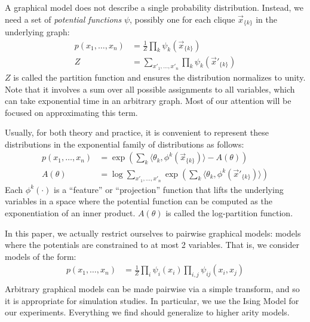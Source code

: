 \documentclass[times, 10pt,twocolumn]{article}
\newcommand{\clique}[1]{\vec #1_{\{k\}}}
\begin{document}
A graphical model does not describe a single probability distribution.
Instead, we need a set of \textit{potential functions} $\psi$, possibly
one for each clique $\clique{x}$ in the underlying graph:
\begin{equation}
  \begin{split}
    p(x_1, \ldots, x_n) &= \frac1Z \prod_{k} \psi_k(\clique{x}) \\
    Z &= \sum_{x'_1, \ldots, x'_n} \prod_{k} \psi_k(\clique{x'})
   \end{split}
   \label{eqn:prob}
 \end{equation}
$Z$ is called the partition function and ensures the distribution
normalizes to unity. Note that it involves a sum over all possible
assignments to all variables, which can take exponential time in an
arbitrary graph. Most of our attention will be focused on
approximating this term.

Usually, for both theory and practice, it is convenient to
represent these distributions in the exponential family of
distributions as follows:
\begin{equation}
  \begin{split}
    p(x_1, \ldots, x_n) &= \exp\left ( \sum_{k} \langle \theta_k,
    \phi^k(\clique{x}) \rangle - A(\theta) \right ) \\
    A(\theta) &= \log \sum_{x'_1, \ldots, x'_n}  \exp\left (
    \sum_{k} \langle \theta_k, \phi^k(\clique{x'}) \rangle \right )
   \end{split}
 \end{equation}
Each $\phi^k(\cdot)$ is a ``feature'' or ``projection'' function
that lifts the underlying variables in a space where the potential
function can be computed as the exponentiation of an inner product.
$A(\theta)$ is called the log-partition function.

In this paper, we actually restrict ourselves to pairwise graphical models:
models where the potentials are constrained to at most 2 variables.
That is, we consider models of the form:
\begin{equation}
  \begin{split}
    p(x_1, \ldots, x_n)  &= \frac1Z \prod_i \psi_i(x_i) \prod_{i,j}
    \psi_{ij}(x_i, x_j) \\
   \end{split}
   \label{eqn:pairwise}
 \end{equation}
Arbitrary graphical models can be made pairwise via a simple
transform, and so it is appropriate for simulation studies. In
particular, we use the Ising Model for our experiments. Everything
we find should generalize to higher arity models.
\end{document}
